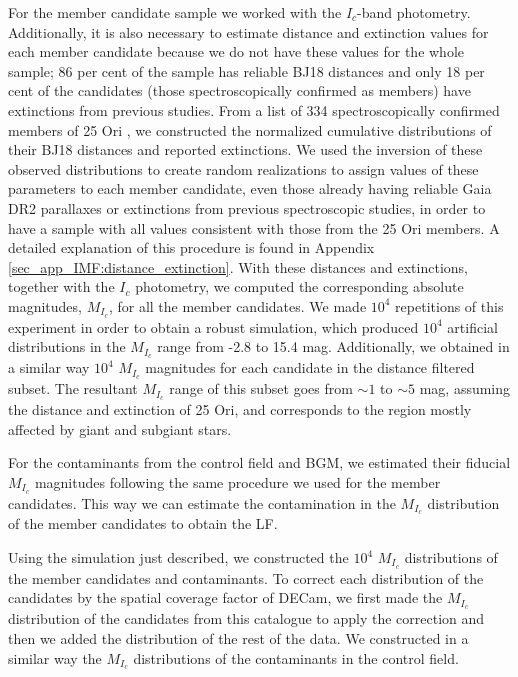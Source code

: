 \documentclass[12pt]{article}
\begin{document}
For the member candidate sample we worked with the $I_c$-band photometry. Additionally, it is also necessary to estimate distance and extinction values for each member candidate because we do not have these values for the whole sample; 86 per cent of the sample has reliable BJ18 distances and only 18 per cent of the candidates (those spectroscopically confirmed as members) have extinctions from previous studies. From a list of 334 spectroscopically confirmed members of 25 Ori \citep{Briceno2005,Briceno2007,Downes2014,Downes2015,Suarez2017,Briceno2018}, we constructed the normalized cumulative distributions of their BJ18 distances and reported extinctions. We used the inversion of these observed distributions to create random realizations to assign values of these parameters to each member candidate, even those already having reliable Gaia DR2 parallaxes or extinctions from previous spectroscopic studies, in order to have a sample with all values consistent with those from the 25 Ori members. A detailed explanation of this procedure is found in Appendix \ref{sec_app_IMF:distance_extinction}. With these distances and extinctions, together with the $I_c$ photometry, we computed the corresponding absolute magnitudes, $M_{I_c}$, for all the member candidates. We made $10^4$ repetitions of this experiment in order to obtain a robust simulation, which produced $10^4$ artificial distributions in the $M_{I_c}$ range from -2.8 to 15.4 mag. Additionally, we obtained in a similar way $10^4$ $M_{I_c}$ magnitudes for each candidate in the distance filtered subset. The resultant $M_{I_c}$ range of this subset goes from $\sim 1$ to $\sim 5$ mag, assuming the distance and extinction of 25 Ori, and corresponds to the region mostly affected by giant and subgiant stars.

For the contaminants from the control field and BGM, we estimated their fiducial $M_{I_c}$ magnitudes following the same procedure we used for the member candidates. This way we can estimate the contamination in the $M_{I_c}$ distribution of the member candidates to obtain the LF.

Using the simulation just described, we constructed the $10^4$ $M_{I_c}$ distributions of the member candidates and contaminants. To correct each distribution of the candidates by the spatial coverage factor of DECam, we first made the $M_{I_c}$ distribution of the candidates from this catalogue to apply the correction and then we added the distribution of the rest of the data. We constructed in a similar way the $M_{I_c}$ distributions of the contaminants in the control field.
\end{document}
